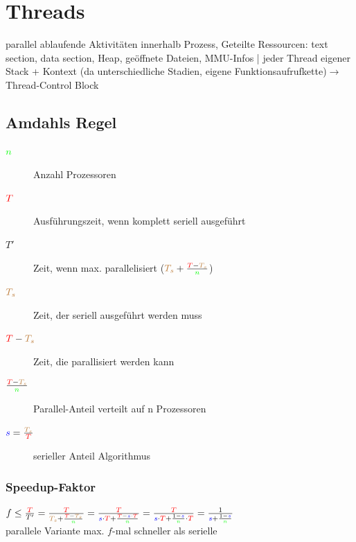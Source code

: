 \section{Threads}
parallel ablaufende Aktivitäten innerhalb Prozess, Geteilte Ressourcen: text section, data section, Heap, geöffnete Dateien, MMU-Infos | jeder Thread eigener Stack + Kontext (da unterschiedliche Stadien, eigene Funktionsaufrufkette)$\rightarrow$Thread-Control Block

\subsection{Amdahls Regel}
\begin{description}
\item[$\textcolor{green}{n}$]Anzahl Prozessoren
\item[$\textcolor{red}{T}$]Ausführungszeit, wenn komplett seriell ausgeführt
\item[$T'$]Zeit, wenn max. parallelisiert ($\textcolor{brown}{\textcolor{brown}{T_{s}}} + \frac{\textcolor{red}{T}-\textcolor{brown}{\textcolor{brown}{\textcolor{brown}{T_{s}}}}}{\textcolor{green}{n}}$)
\item[$\textcolor{brown}{\textcolor{brown}{\textcolor{brown}{T_{s}}}}$]Zeit, der seriell ausgeführt werden muss
\item[$\textcolor{red}{T} - \textcolor{brown}{\textcolor{brown}{\textcolor{brown}{T_{s}}}}$]Zeit, die parallisiert werden kann
\item[$\frac{\textcolor{red}{T} - \textcolor{brown}{\textcolor{brown}{\textcolor{brown}{T_{s}}}}}{\textcolor{green}{n}}$]Parallel-Anteil verteilt auf n Prozessoren
\item[$\textcolor{blue}{s} = \frac{\textcolor{brown}{T_s}}{\textcolor{red}{T}}$]serieller Anteil Algorithmus
\end{description}

\subsubsection{Speedup-Faktor}
$f \le \frac{\textcolor{red}{T}}{T'} = \frac{\textcolor{red}{T}}{\textcolor{brown}{\textcolor{brown}{\textcolor{brown}{T_{s}}}} + \frac{\textcolor{red}{T} - \textcolor{brown}{\textcolor{brown}{\textcolor{brown}{T_{s}}}}}{\textcolor{green}{n}}} = \frac{\textcolor{red}{T}}{\textcolor{blue}{s} \cdot \textcolor{red}{T} + \frac{\textcolor{red}{T}-\textcolor{blue}{s}\cdot \textcolor{red}{T}}{\textcolor{green}{n}}} = \frac{\textcolor{red}{T}}{\textcolor{blue}{s} \cdot \textcolor{red}{T} + \frac{1-\textcolor{blue}{s}}{\textcolor{green}{n}} \cdot \textcolor{red}{T}} = \frac{1}{\textcolor{blue}{s} + \frac{1-\textcolor{blue}{s}}{\textcolor{green}{n}}}$\\
parallele Variante max. $f$-mal schneller als serielle

